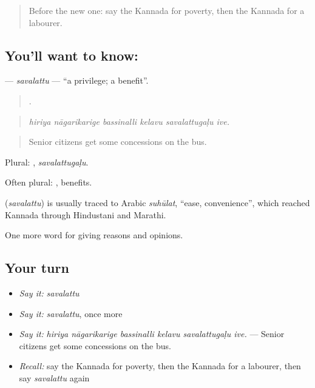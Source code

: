\label{lesson:KA-C399-savalattu}



\begin{quote}
Before the new one: say the Kannada for poverty, then the Kannada for a labourer.
\end{quote}

\subsection*{You'll want to know: }
\textbf{} — \emph{savalattu} — \textquotedblleft{}a privilege; a benefit\textquotedblright{}.

\begin{quote}
     .
\end{quote}

\begin{quote}
\emph{hiriya nāgarikarige bassinalli kelavu savalattugaḷu ive.}
\end{quote}

\begin{quote}
Senior citizens get some concessions on the bus.
\end{quote}

Plural: , \emph{savalattugaḷu}.

Often plural: , benefits.

\begin{cousinweb}
\textbf{} (\emph{savalattu}) is usually traced to Arabic \emph{suhūlat}, \textquotedblleft{}ease, convenience\textquotedblright{}, which reached Kannada through Hindustani and Marathi.
\end{cousinweb}

\begin{grammarlens}[title={What you've built}]
One more word for giving reasons and opinions.
\end{grammarlens}

\subsection*{Your turn}
\begin{itemize}
\raggedright
  \item \emph{Say it:} \emph{savalattu}
  \item \emph{Say it:} \emph{savalattu}, once more
  \item \emph{Say it:} \emph{hiriya nāgarikarige bassinalli kelavu savalattugaḷu ive.} — Senior citizens get some concessions on the bus.
  \item \emph{Recall:} say the Kannada for poverty, then the Kannada for a labourer, then say \emph{savalattu} again
\end{itemize}

